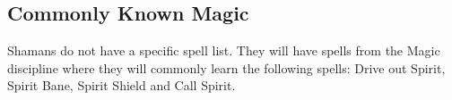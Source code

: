 \subsection{Commonly Known Magic}
Shamans do not have a specific spell list. They will have spells from the Magic discipline where they will commonly learn the following spells: Drive out Spirit, Spirit Bane, Spirit Shield and Call Spirit.





